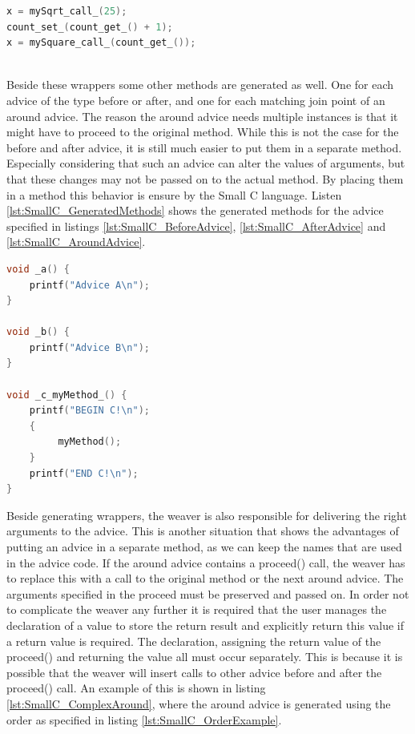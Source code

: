 \documentclass[a4paper]{report}
\begin{document}
\begin{minipage}{0.45\textwidth}
\begin{lstlisting}[language=C, caption=Example of code after weaving., label=lst:SmallC_WrapperUsageAfter]
x = mySqrt_call_(25);
count_set_(count_get_() + 1);
x = mySquare_call_(count_get_());
\end{lstlisting}
\end{minipage}\\
Beside these wrappers some other methods are generated as well. One for each advice of the type before or after, and one for each matching join point of an around advice. The reason the around advice needs multiple instances is that it might have to proceed to the original method. While this is not the case for the before and after advice, it is still much easier to put them in a separate method. Especially considering that such an advice can alter the values of arguments, but that these changes may not be passed on to the actual method. By placing them in a method this behavior is ensure by the Small C language. Listen \ref{lst:SmallC_GeneratedMethods} shows the generated methods for the advice specified in listings \ref{lst:SmallC_BeforeAdvice}, \ref{lst:SmallC_AfterAdvice} and \ref{lst:SmallC_AroundAdvice}.\\
\begin{lstlisting}[language=C, caption=Generated methods., label=lst:SmallC_GeneratedMethods]
void _a() {
	printf("Advice A\n");
}

void _b() {
	printf("Advice B\n");
}

void _c_myMethod_() {
	printf("BEGIN C!\n");
	{
		 myMethod();
	}
	printf("END C!\n");
}
\end{lstlisting}
Beside generating wrappers, the weaver is also responsible for delivering the right arguments to the advice. This is another situation that shows the advantages of putting an advice in a separate method, as we can keep the names that are used in the advice code. If the around advice contains a proceed() call, the weaver has to replace this with a call to the original method or the next around advice. The arguments specified in the proceed must be preserved and passed on. In order not to complicate the weaver any further it is required that the user manages the declaration of a value to store the return result and explicitly return this value if a return value is required. The declaration, assigning the return value of the proceed() and returning the value all must occur separately. This is because it is possible that the weaver will insert calls to other advice before and after the proceed() call. An example of this is shown in listing \ref{lst:SmallC_ComplexAround}, where the around advice is generated using the order as specified in listing \ref{lst:SmallC_OrderExample}.\\
\end{document}
